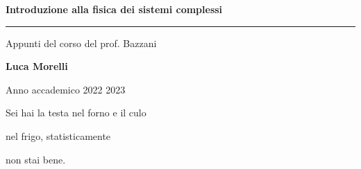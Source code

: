 \begin{titlepage}
	\begin{center}
	\huge \textbf{Introduzione alla fisica dei sistemi complessi}
	
	\rule{7cm}{0.4pt} 
	
	\LARGE Appunti del corso del prof. Bazzani
	
	\vspace{40pt}
	
	\LARGE \textbf{Luca Morelli}
	
	\vspace{20pt}
	
	\LARGE Anno accademico 2022 2023
	
	\end{center}
   
   \vspace{200pt}
   
    \begin{flushright}
    	Sei hai la testa nel forno e il culo
    	
    	 nel frigo, statisticamente
    	
    	 non stai bene.
    	
    \end{flushright}	
\end{titlepage}
